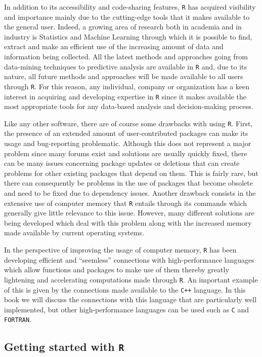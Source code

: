 \documentclass[]{book}
\theoremstyle{definition}
\theoremstyle{definition}
\theoremstyle{remark}
\begin{document}
In addition to its accessibility and code-sharing features, \texttt{R}
has acquired visibility and importance mainly due to the cutting-edge
tools that it makes available to the general user. Indeed, a growing
area of research both in academia and in industry is Statistics and
Machine Learning through which it is possible to find, extract and make
an efficient use of the increasing amount of data and information being
collected. All the latest methods and approaches going from data-mining
techniques to predictive analysis are available in \texttt{R} and, due
to its nature, all future methods and approaches will be made available
to all users through \texttt{R}. For this reason, any individual,
company or organization has a keen interest in acquiring and developing
expertise in \texttt{R} since it makes available the most appropriate
tools for any data-based analysis and decision-making process.

Like any other software, there are of course some drawbacks with using
\texttt{R}. First, the presence of an extended amount of
user-contributed packages can make its usage and bug-reporting
problematic. Although this does not represent a major problem since many
forums exist and solutions are usually quickly fixed, there can be many
issues concerning package updates or deletions that can create problems
for other existing packages that depend on them. This is fairly rare,
but there can consequently be problems in the use of packages that
become obsolete and need to be fixed due to dependency issues. Another
drawback consists in the extensive use of computer memory that
\texttt{R} entails through its commands which generally give little
relevance to this issue. However, many different solutions are being
developed which deal with this problem along with the increased memory
made available by current operating systems.

In the perspective of improving the usage of computer memory, \texttt{R}
has been developing efficient and ``seemless'' connections with
high-performance languages which allow functions and packages to make
use of them thereby greatly lightening and accelerating computations
made through \texttt{R}. An important example of this is given by the
connections made available to the \texttt{C++} language. In this book we
will discuss the connections with this language that are particularly
well implemented, but other high-performance languages can be used such
as \texttt{C} and \texttt{FORTRAN}.

\subsection{\texorpdfstring{Getting started with
\texttt{R}}{Getting started with R}}\label{getting-started-with-r}
\end{document}
